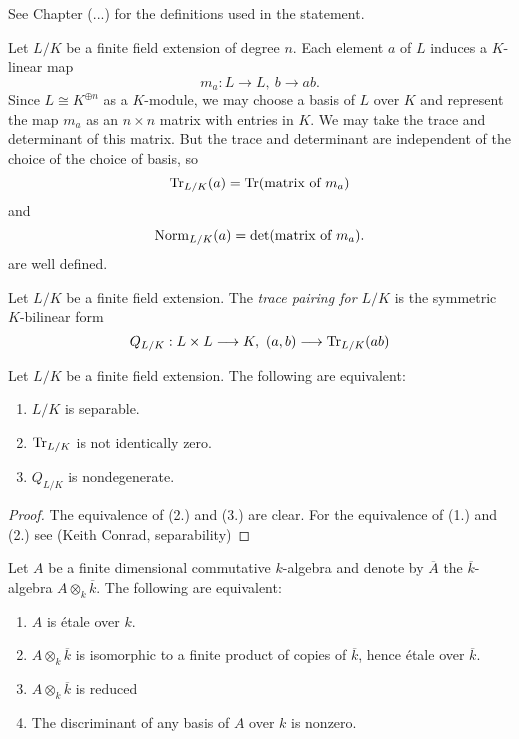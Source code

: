 See Chapter (...) for the definitions used in the statement.

Let $L/K$ be a finite field extension of degree $n$. Each element $a$ of $L$ induces a $K$-linear map
\[
	m_a: L \to L,\ b \to ab.
\]
Since $L \cong K^{\oplus n}$ as a $K$-module, we may choose a basis of $L$ over $K$ and represent the map $m_a$ as an $n \times n$ matrix with entries in $K$. We may take the trace and determinant of this matrix. But the trace and determinant are independent of the choice of the choice of basis, so
\[
	\operatorname{Tr}_{L/K}(a) = \operatorname{Tr}(\text{matrix of }m_a)
\]
and
\[
	\operatorname{Norm}_{L/K}(a) = \text{det}(\text{matrix of }m_a).
\]
are well defined.

\begin{definition}
	Let $L/K$ be a finite field extension. The \textit{trace pairing for $L/K$} is the symmetric $K$-bilinear form
	\[
		Q_{L/K} : L \times L \longrightarrow K,\ (a,b) \longrightarrow \operatorname{Tr}_{L/K}(ab)
	\]
\end{definition}

\begin{lemma}
	Let $L/K$ be a finite field extension. The following are equivalent:
	\begin{enumerate}
		\item $L/K$ is separable.
		\item $\operatorname{Tr}_{L/K}$ is not identically zero.
		\item $Q_{L/K}$ is nondegenerate.
	\end{enumerate}
\end{lemma}

\begin{proof}
	The equivalence of (2.) and (3.) are clear.
	For the equivalence of (1.) and (2.) see (Keith Conrad, separability)
\end{proof}

\begin{theorem}
	Let $A$ be a finite dimensional commutative $k$-algebra and denote by $\overline{A}$ the $\overline{k}$-algebra $A \otimes_k \overline{k}$. The following are equivalent:
	\begin{enumerate}
		\item $A$ is \'etale over $k$.\label{etale}
		\item $A \otimes_k \overline{k}$ is isomorphic to a finite product of copies of $\overline{k}$, hence \'etale over $\overline{k}$.\label{product}
		\item $A \otimes_k \overline{k}$ is reduced
		\item The discriminant of any basis of $A$ over $k$ is nonzero.\label{trace}
	\end{enumerate}
\end{theorem}

